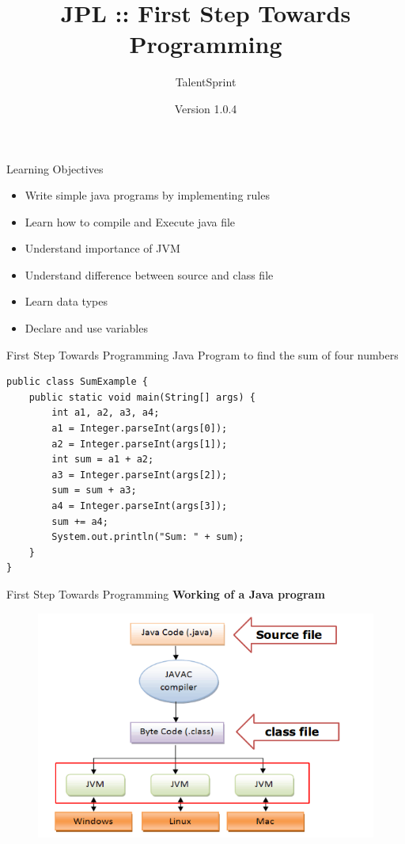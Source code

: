 \documentclass[14pt]{beamer}
\title{JPL :: First Step Towards Programming}
\author[TS]{TalentSprint}
\institute[L\&D]{Licensed To Skill}
\date{Version 1.0.4}
\begin{document}
\begin{frame}
  \titlepage
\end{frame}

\begin{frame}{Learning Objectives}

  \begin{itemize}
  \item Write simple java programs by implementing rules
  \item Learn how to compile and Execute java file
  \item Understand importance of JVM
  \item Understand difference between source and class file
  \item Learn data types
  \item Declare and use variables
  \end{itemize}
\end{frame}

\begin{frame}[fragile]{First Step Towards Programming}
 Java Program to find the sum of four numbers
 \begin{lstlisting}
public class SumExample {
    public static void main(String[] args) {
        int a1, a2, a3, a4;
        a1 = Integer.parseInt(args[0]);
        a2 = Integer.parseInt(args[1]);
        int sum = a1 + a2;
        a3 = Integer.parseInt(args[2]);
        sum = sum + a3;
        a4 = Integer.parseInt(args[3]);
        sum += a4;  
        System.out.println("Sum: " + sum);
    }
}
 \end{lstlisting}
\end{frame}

\begin{frame}{First Step Towards Programming}
\textbf{Working of a Java program}
\begin{figure}[H]
 \begin{center}
  \includegraphics[scale=.4]{working-of-java-program.png}
 \end{center}
\end{figure}
\end{frame}
\end{document}
